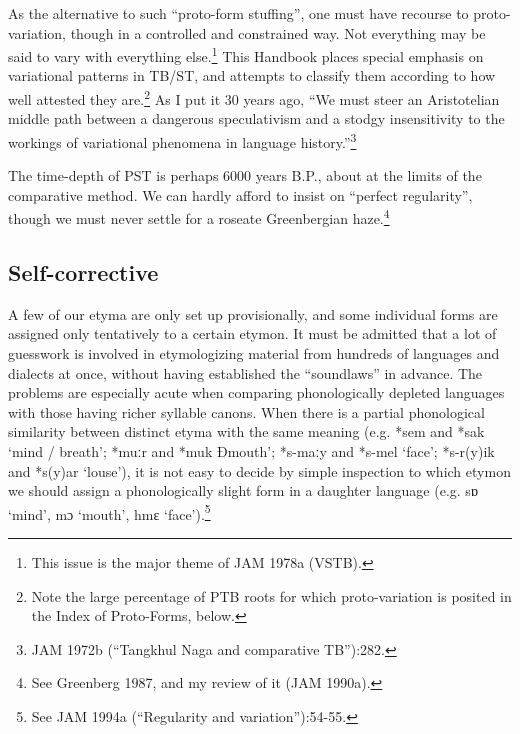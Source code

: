 As the alternative to such ``proto-form stuffing'', one must have recourse to proto-variation, though in a controlled and constrained way. Not everything may be said to vary with everything else.\footnote{This issue is the major theme of JAM 1978a (VSTB).} This Handbook places special emphasis on variational patterns in TB/ST, and attempts to classify them according to how well attested they are.\footnote{Note the large percentage of PTB roots for which proto-variation is posited in the Index of Proto-Forms, below.} As I put it 30 years ago, ``We must steer an Aristotelian middle path between a dangerous speculativism and a stodgy insensitivity to the workings of variational phenomena in language history.''\footnote{JAM 1972b (“Tangkhul Naga and comparative TB”):282.}

The time-depth of PST is perhaps 6000 years B.P., about at the limits of the comparative method. We can hardly afford to insist on ``perfect regularity'', though we must never settle for a roseate Greenbergian haze.\footnote{See Greenberg 1987, and my review of it (JAM 1990a).}

\subsection{Self-corrective}
A few of our etyma are only set up provisionally, and some individual forms are assigned only tentatively to a certain etymon. It must be admitted that a lot of guesswork is involved in etymologizing material from hundreds of languages and dialects at once, without having established the ``soundlaws'' in advance. The problems are especially acute when comparing phonologically depleted languages with those having richer syllable canons. When there is a partial phonological similarity between distinct etyma with the same meaning (e.g. *sem and *sak `mind / breath'; *muːr and *muk Ðmouth'; *s-maːy and *s-mel `face'; *s-r(y)ik and *s(y)ar `louse'), it is not easy to decide by simple inspection to which etymon we should assign a phonologically slight form in a daughter language (e.g. sɒ `mind', mɔ `mouth', hmɛ `face').\footnote{See JAM 1994a (“Regularity and variation”):54-55.}


